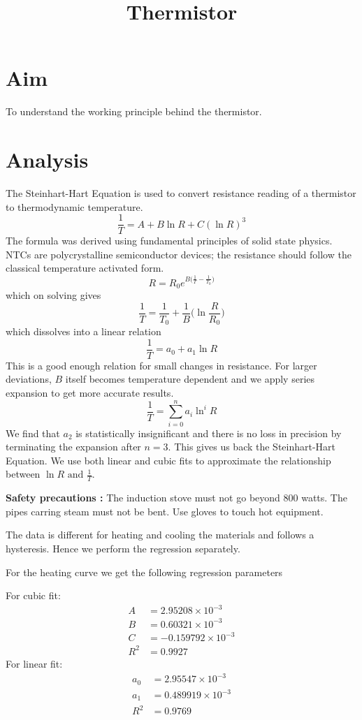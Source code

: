 \documentclass[12pt]{article}
\newlength\fwidth
\newlength\fheight
\begin{document}
\author{}
\date{}
\title{Thermistor}
\maketitle
\section*{Aim}
To understand the working principle behind the thermistor.
\section*{Analysis}
The Steinhart-Hart Equation is used to convert resistance reading of a thermistor to thermodynamic temperature.
\[\frac{1}{T} = A + B\ln R + C(\ln R)^3\]
The formula was derived using fundamental principles of solid state physics. NTCs are polycrystalline
semiconductor devices; the resistance should follow the classical temperature activated form.
\[R = R_0 e^{B\big(\frac{1}{T}-\frac{1}{T_0}\big)}\]
which on solving gives
\[\frac{1}{T} = \frac{1}{T_0} + \frac{1}{B}\bigg( \ln \frac{R}{R_0}\bigg)\]
which dissolves into a linear relation
\[\frac{1}{T} = a_0 + a_1 \ln R\]
This is a good enough relation for small changes in resistance.
For larger deviations, $B$ itself becomes temperature dependent and we apply series expansion to get more accurate results.
\[\frac{1}{T} = \sum_{i =0 }^{n} a_i \ln ^i R\]
We find that $a_2$ is statistically insignificant and there is no loss in precision by terminating the expansion after $n =3 $.
This gives us back the Steinhart-Hart Equation.
We use both linear and cubic fits to approximate the relationship between $\ln R \text{ and } \frac{1}{T}$.
\vspace*{7pt}

\noindent \textbf{Safety precautions :}
The induction stove must not go beyond 800 watts.
The pipes carring steam must not be bent.
Use gloves to touch hot equipment.

\pagebreak

The data is different for heating and cooling the materials and follows a hysteresis.
Hence we perform the regression separately.
\begin{figure}[H]
    \centering
    \setlength{}
    \setlength{}
    
\end{figure}
For the heating curve we get the following regression parameters

\noindent For cubic fit:\begin{align*}
    A &= 2.95208 \times 10^{-3}\\
    B &=0.60321 \times 10^{-3}\\
    C &=-0.159792 \times 10^{-3}\\
    R^{2}&=0.9927
\end{align*}
For linear fit:
\begin{align*}
    a_0 &= 2.95547 \times 10^{-3} \\
    a_1 &=0.489919 \times 10^{-3} \\
    R^{2}&=0.9769
\end{align*}
\end{document}
